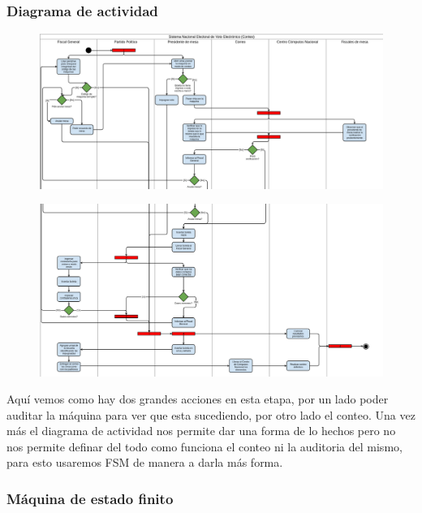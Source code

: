 \subsubsection{Diagrama de actividad}
\begin{figure}[h!]
\centering
\includegraphics[scale=0.5]{imagenes/actividad/actividadConteo1}
\end{figure}			
\newpage
\begin{figure}[h!]
\centering
\includegraphics[scale=0.5]{imagenes/actividad/actividadConteo2}
\end{figure}

Aquí vemos como hay dos grandes acciones en esta etapa, por un lado poder auditar la máquina para ver que esta sucediendo, por otro lado el conteo. Una vez más el diagrama de actividad nos permite dar una forma de lo hechos pero no nos permite definar del todo como funciona el conteo ni la auditoria del mismo, para esto usaremos FSM de manera a darla más forma.

\subsubsection{Máquina de estado finito}

